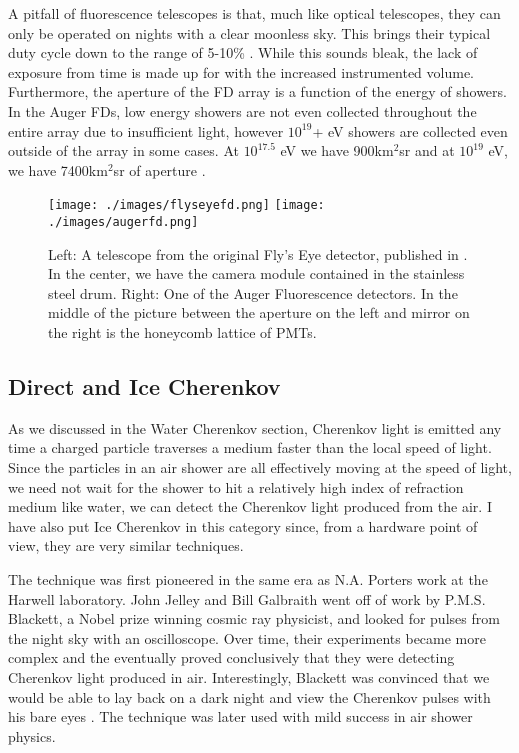 A pitfall of fluorescence telescopes is that, much like optical telescopes, they can only be operated on nights with a clear moonless sky. This brings their typical duty cycle down to the range of 5-10\% \cite{flyseye,fluorauger,ultraray}. While this sounds bleak, the lack of exposure from time is made up for with the increased instrumented volume. Furthermore, the aperture of the FD array is a function of the energy of showers. In the Auger FDs, low energy showers are not even collected throughout the entire array due to insufficient light, however $10^{19}$+ eV showers are collected even outside of the array in some cases. At $10^{17.5}$ eV we have 900km$^2$sr and at $10^{19}$ eV, we have 7400km$^2$sr of aperture \cite{fluorauger}.
\begin{figure}[h!]
\begin{center}
\texttt{[image: ./images/flyseyefd.png]}
\texttt{[image: ./images/augerfd.png]}
\caption[Auger and Fly's Eye FDs]{Left: A telescope from the original Fly's Eye detector, published in \textcite{flyseye}. In the center, we have the camera module contained in the stainless steel drum. Right: One of the Auger Fluorescence detectors. In the middle of the picture between the aperture on the left and mirror on the right is the honeycomb lattice of PMTs.}
\label{fdpics}
\end{center}
\end{figure}
\subsection{Direct and Ice Cherenkov}
As we discussed in the Water Cherenkov section, Cherenkov light is emitted any time a charged particle traverses a medium faster than the local speed of light. Since the particles in an air shower are all effectively moving at the speed of light, we need not wait for the shower to hit a relatively high index of refraction medium like water, we can detect the Cherenkov light produced from the air. I have also put Ice Cherenkov in this category since, from a hardware point of view, they are very similar techniques.

The technique was first pioneered in the same era as N.A. Porters work at the Harwell laboratory. John Jelley and Bill Galbraith went off of work by P.M.S. Blackett, a Nobel prize winning cosmic ray physicist, and looked for pulses from the night sky with an oscilloscope. Over time, their experiments became more complex and the eventually proved conclusively that they were detecting Cherenkov light produced in air. Interestingly, Blackett was convinced that we would be able to lay back on a dark night and view the Cherenkov pulses with his bare eyes \cite{firstcher}. The technique was later used with mild success in air shower physics.

